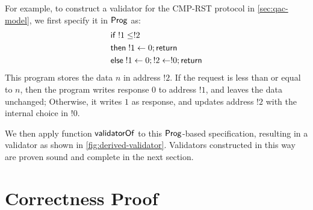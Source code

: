 For example, to construct a validator for the CMP-RST protocol in
\autoref{sec:qac-model}, we first specify it in $\mathsf{Prog}$ as:
\begin{align*}
  &\mathsf{if}\;!1\le!2\\
  &\mathsf{then}\;!1\gets0;\mathsf{return}\\
  &\mathsf{else}\;!1\gets0;!2\gets!0;\mathsf{return}
\end{align*}
This program stores the data $n$ in address $!2$.  If the request is less than
or equal to $n$, then the program writes response $0$ to address $!1$, and
leaves the data unchanged; Otherwise, it writes $1$ as response, and updates
address $!2$ with the internal choice in $!0$.

We then apply function $\mathsf{validatorOf}$ to this $\mathsf{Prog}$-based specification,
resulting in a validator as shown in \autoref{fig:derived-validator}.
Validators constructed in this way are proven sound and complete in the next
section.

\section{Correctness Proof}
\label{sec:proof}

